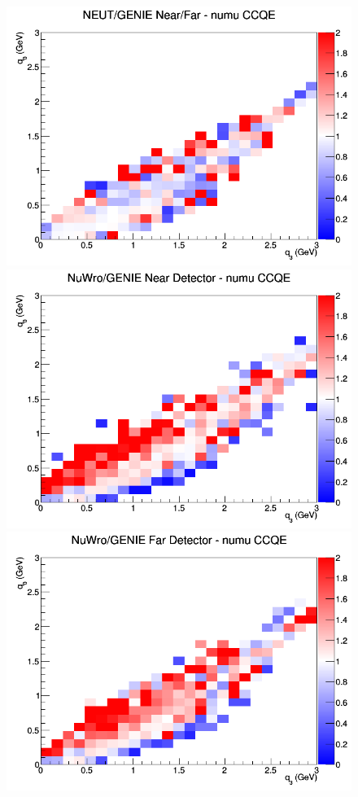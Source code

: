 \documentclass[12pt]{article}
\begin{document}
\begin{figure}[h]
\endminipage
{}
\includegraphics[width=\linewidth]{eff_q0_q3/LAr/ratios/CCQE_NEUT_GENIE_numu_NF_q3_q0.png}
\endminipage
\newline
{}
\includegraphics[width=\linewidth]{eff_q0_q3/LAr/ratios/CCQE_NuWro_GENIE_numu_near_q3_q0.png}
\endminipage
{}
\includegraphics[width=\linewidth]{eff_q0_q3/LAr/ratios/CCQE_NuWro_GENIE_numu_far_q3_q0.png}

\end{figure}
\end{document}
